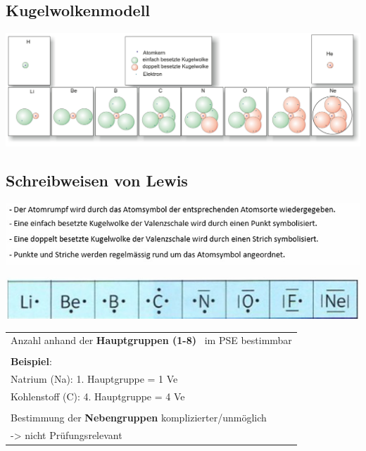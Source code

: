 \subsection{Kugelwolkenmodell}	
\begin{center}
	\includegraphics[width=\columnwidth]{images/kugelwolkenmodell.jpg}
\end{center}

\subsection{Schreibweisen von Lewis} 

\begin{flushleft}
	\includegraphics[width=0.7\columnwidth]{images/lewis-schreibweise.png}
\end{flushleft}
\begin{center}
	\includegraphics[width=\columnwidth]{images/Lewis-schreibweise_2.png}
\end{center}

\begin{tabular}{l}
	Anzahl anhand der \textbf{Hauptgruppen (1-8)}~ im PSE bestimmbar \\
	\\
	\textbf{Beispiel}: \\
	Natrium (Na): 1. Hauptgruppe = 1 Ve \\
	Kohlenstoff (C): 4. Hauptgruppe = 4 Ve \\
	\\
	Bestimmung der \textbf{Nebengruppen} komplizierter/unmöglich \\ -> nicht Prüfungsrelevant \\
\end{tabular}

           
